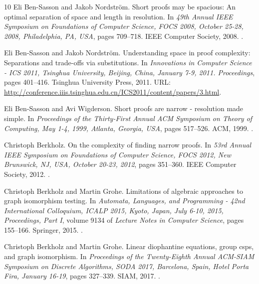 \documentclass[10pt,a4paper]{article}
\begin{document}
\begin{thebibliography}{10}
Eli Ben{-}Sasson and Jakob Nordstr{\"{o}}m.
\newblock Short proofs may be spacious: An optimal separation of space and
  length in resolution.
\newblock In {\em 49th Annual {IEEE} Symposium on Foundations of Computer
  Science, {FOCS} 2008, October 25-28, 2008, Philadelphia, PA, {USA}}, pages
  709--718. {IEEE} Computer Society, 2008.
\newblock \href {https://doi.org/10.1109/FOCS.2008.42}
  {}.

Eli Ben{-}Sasson and Jakob Nordstr{\"{o}}m.
\newblock Understanding space in proof complexity: Separations and trade-offs
  via substitutions.
\newblock In {\em Innovations in Computer Science - {ICS} 2011, Tsinghua
  University, Beijing, China, January 7-9, 2011. Proceedings}, pages 401--416.
  Tsinghua University Press, 2011.
\newblock URL:
  \url{http://conference.iiis.tsinghua.edu.cn/ICS2011/content/papers/3.html}.

Eli Ben{-}Sasson and Avi Wigderson.
\newblock Short proofs are narrow - resolution made simple.
\newblock In {\em Proceedings of the Thirty-First Annual {ACM} Symposium on
  Theory of Computing, May 1-4, 1999, Atlanta, Georgia, {USA}}, pages 517--526.
  {ACM}, 1999.
\newblock \href {https://doi.org/10.1145/301250.301392}
  {}.

Christoph Berkholz.
\newblock On the complexity of finding narrow proofs.
\newblock In {\em 53rd Annual {IEEE} Symposium on Foundations of Computer
  Science, {FOCS} 2012, New Brunswick, NJ, USA, October 20-23, 2012}, pages
  351--360. {IEEE} Computer Society, 2012.
\newblock \href {https://doi.org/10.1109/FOCS.2012.48}
  {}.

Christoph Berkholz and Martin Grohe.
\newblock Limitations of algebraic approaches to graph isomorphism testing.
\newblock In {\em Automata, Languages, and Programming - 42nd International
  Colloquium, {ICALP} 2015, Kyoto, Japan, July 6-10, 2015, Proceedings, Part
  {I}}, volume 9134 of {\em Lecture Notes in Computer Science}, pages 155--166.
  Springer, 2015.
\newblock \href {https://doi.org/10.1007/978-3-662-47672-7\_13}
  {}.

Christoph Berkholz and Martin Grohe.
\newblock Linear diophantine equations, group csps, and graph isomorphism.
\newblock In {\em Proceedings of the Twenty-Eighth Annual {ACM-SIAM} Symposium
  on Discrete Algorithms, {SODA} 2017, Barcelona, Spain, Hotel Porta Fira,
  January 16-19}, pages 327--339. {SIAM}, 2017.
\newblock \href {https://doi.org/10.1137/1.9781611974782.21}
  {}.


\end{thebibliography}
\end{document}
